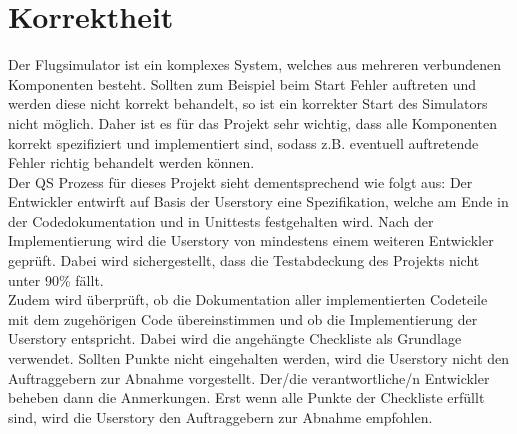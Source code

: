 \documentclass[accentcolor=tud9c,12pt,paper=a4]{tudreport}
\begin{document}
		\section{Korrektheit}
		Der Flugsimulator ist ein komplexes System, welches aus mehreren verbundenen Komponenten besteht.
		Sollten zum Beispiel beim Start Fehler auftreten und werden diese nicht korrekt behandelt, so
		ist ein korrekter Start des Simulators nicht möglich. Daher ist es für das Projekt
		sehr wichtig, dass alle Komponenten korrekt spezifiziert und implementiert sind,
		sodass z.B. eventuell auftretende Fehler richtig behandelt werden können.
		\\[5pt]
		Der QS Prozess für dieses Projekt sieht dementsprechend wie folgt aus:
		Der Entwickler entwirft auf Basis der Userstory eine Spezifikation, welche am Ende
		in der Codedokumentation und in Unittests festgehalten wird.
		Nach der Implementierung wird die Userstory von mindestens einem weiteren
		Entwickler geprüft. Dabei wird sichergestellt, dass die Testabdeckung des Projekts
		nicht unter 90\% fällt.
		\\[5pt]
		Zudem wird überprüft, ob die Dokumentation aller implementierten
		Codeteile mit dem zugehörigen Code übereinstimmen und ob die Implementierung der
		Userstory entspricht. Dabei wird die angehängte Checkliste als Grundlage verwendet.
		Sollten Punkte nicht eingehalten werden, wird die Userstory nicht den Auftraggebern zur
		Abnahme vorgestellt. Der/die verantwortliche/n Entwickler beheben dann die Anmerkungen.
		Erst wenn alle Punkte der Checkliste erfüllt sind, wird die Userstory den Auftraggebern
		zur Abnahme empfohlen.
				
\end{document}
